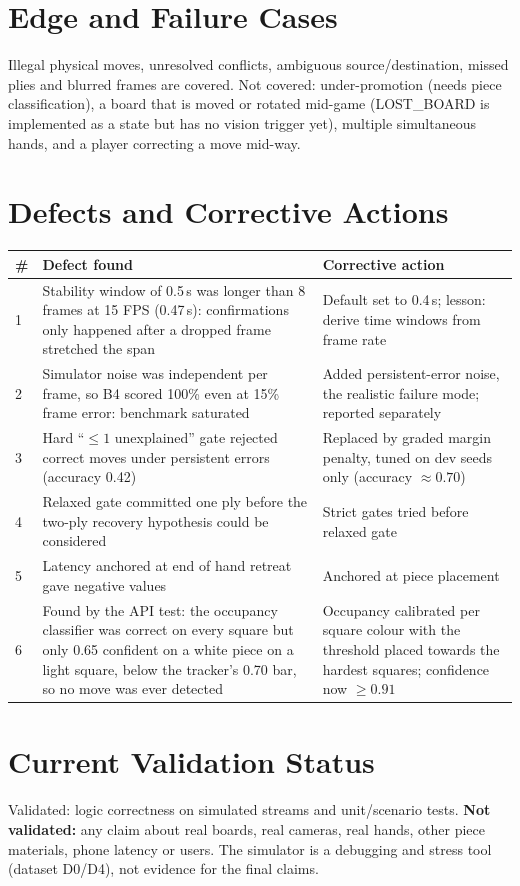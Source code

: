 \section{Edge and Failure Cases}
Illegal physical moves, unresolved conflicts, ambiguous source/destination, missed plies and blurred frames are covered.
Not covered: under-promotion (needs piece classification), a board that is moved or rotated mid-game (LOST\_BOARD is
implemented as a state but has no vision trigger yet), multiple simultaneous hands, and a player correcting a
move mid-way.

\section{Defects and Corrective Actions}
\begin{longtable}{p{}p{}p{}}
\toprule \# & Defect found & Corrective action\\ \midrule
1 & Stability window of 0.5\,s was longer than 8 frames at 15 FPS (0.47\,s): confirmations only happened after a dropped frame stretched the span & Default set to 0.4\,s; lesson: derive time windows from frame rate\\
2 & Simulator noise was independent per frame, so B4 scored 100\% even at 15\% frame error: benchmark saturated & Added persistent-error noise, the realistic failure mode; reported separately\\
3 & Hard ``$\leq1$ unexplained'' gate rejected correct moves under persistent errors (accuracy 0.42) & Replaced by graded margin penalty, tuned on dev seeds only (accuracy $\approx0.70$)\\
4 & Relaxed gate committed one ply before the two-ply recovery hypothesis could be considered & Strict gates tried before relaxed gate\\
5 & Latency anchored at end of hand retreat gave negative values & Anchored at piece placement\\
6 & Found by the API test: the occupancy classifier was correct on every square but only 0.65 confident on a white piece on a light square, below the tracker's 0.70 bar, so no move was ever detected & Occupancy calibrated per square colour with the threshold placed towards the hardest squares; confidence now $\geq0.91$\\
\bottomrule
\end{longtable}

\section{Current Validation Status}
Validated: logic correctness on simulated streams and unit/scenario tests. \textbf{Not validated:} any claim about
real boards, real cameras, real hands, other piece materials, phone latency or users. The simulator is a debugging
and stress tool (dataset D0/D4), not evidence for the final claims.
